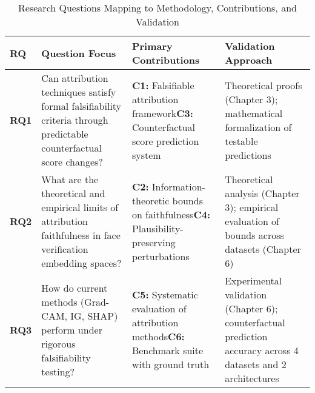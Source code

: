 
\begin{table}[htbp]
\centering
\caption{Research Questions Mapping to Methodology, Contributions, and Validation}
\label{tab:rq_mapping}
\small
\begin{tabularx}{\textwidth}{>{\centering\arraybackslash}p{}X>{\raggedright\arraybackslash}p{}>{\raggedright\arraybackslash}p{}}
\toprule
\textbf{RQ} & \textbf{Question Focus} & \textbf{Primary Contributions} & \textbf{Validation Approach} \\
\midrule
\textbf{RQ1} & Can attribution techniques satisfy formal falsifiability criteria through predictable counterfactual score changes? & \textbf{C1:} Falsifiable attribution framework\newline\textbf{C3:} Counterfactual score prediction system & Theoretical proofs (Chapter 3); mathematical formalization of testable predictions \\[10pt]

\textbf{RQ2} & What are the theoretical and empirical limits of attribution faithfulness in face verification embedding spaces? & \textbf{C2:} Information-theoretic bounds on faithfulness\newline\textbf{C4:} Plausibility-preserving perturbations & Theoretical analysis (Chapter 3); empirical evaluation of bounds across datasets (Chapter 6) \\[10pt]

\textbf{RQ3} & How do current methods (Grad-CAM, IG, SHAP) perform under rigorous falsifiability testing? & \textbf{C5:} Systematic evaluation of attribution methods\newline\textbf{C6:} Benchmark suite with ground truth & Experimental validation (Chapter 6); counterfactual prediction accuracy across 4 datasets and 2 architectures \\[10pt]


\end{tabularx}
\end{table}
